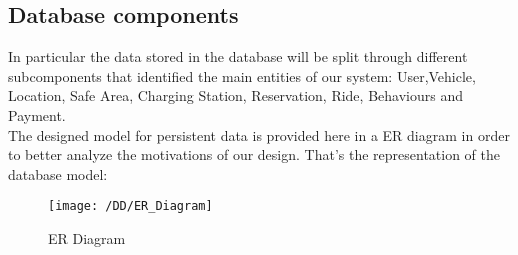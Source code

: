 \newpage
\subsection{Database components}
In particular the data stored in the database will be split through different subcomponents that identified the main entities of our system:
User,Vehicle, Location, Safe Area, Charging Station, Reservation, Ride, Behaviours and Payment.  
\\The designed model for persistent data is provided here in a ER diagram in order to better analyze the motivations of our design. That's the representation of the database model:
\begin{figure}[!ht]
  \centering
  \vspace{0.2cm}
  \texttt{[image: /DD/ER\_Diagram]}\\
  \vspace{0.4cm}
  \caption{ER Diagram} 
  \label{fig:ER_Diagram} 
\end{figure}

